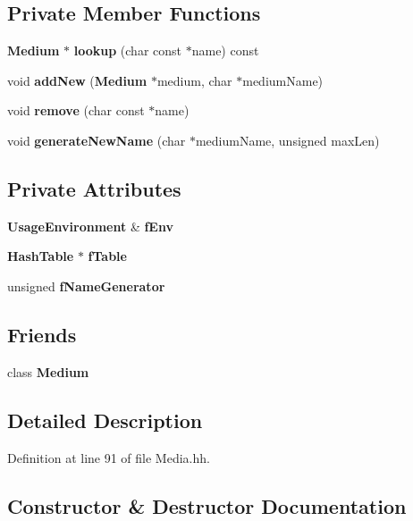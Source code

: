 \subsection*{Private Member Functions}
\begin{DoxyCompactItemize}
\item 
{\bf Medium} $\ast$ {\bf lookup} (char const $\ast$name) const 
\item 
void {\bf add\+New} ({\bf Medium} $\ast$medium, char $\ast$medium\+Name)
\item 
void {\bf remove} (char const $\ast$name)
\item 
void {\bf generate\+New\+Name} (char $\ast$medium\+Name, unsigned max\+Len)
\end{DoxyCompactItemize}
\subsection*{Private Attributes}
\begin{DoxyCompactItemize}
\item 
{\bf Usage\+Environment} \& {\bf f\+Env}
\item 
{\bf Hash\+Table} $\ast$ {\bf f\+Table}
\item 
unsigned {\bf f\+Name\+Generator}
\end{DoxyCompactItemize}
\subsection*{Friends}
\begin{DoxyCompactItemize}
\item 
class {\bf Medium}
\end{DoxyCompactItemize}


\subsection{Detailed Description}


Definition at line 91 of file Media.\+hh.



\subsection{Constructor \& Destructor Documentation}
